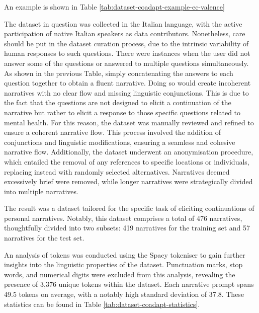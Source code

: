 
An example is shown in Table \ref{tab:dataset-coadapt-example-ec-valence}

The dataset in question was collected in the Italian language, with the active participation of native Italian speakers as data contributors. Nonetheless, care should be put in the dataset curation process, due to the intrinsic variability of human responses to such questions. There were instances when the user did not answer some of the questions or answered to multiple questions simultaneously. As shown in the previous Table, simply concatenating the answers to each question together to obtain a fluent narrative. Doing so would create incoherent narratives with no clear flow and missing linguistic conjunctions. This is due to the fact that the questions are not designed to elicit a continuation of the narrative but rather to elicit a response to those specific questions related to mental health.
For this reason, the dataset was manually reviewed and refined to ensure a coherent narrative flow. This process involved the addition of conjunctions and linguistic modifications, ensuring a seamless and cohesive narrative flow. Additionally, the dataset underwent an anonymisation procedure, which entailed the removal of any references to specific locations or individuals, replacing instead with randomly selected alternatives. Narratives deemed excessively brief were removed, while longer narratives were strategically divided into multiple narratives.
% 

The result was a dataset tailored for the specific task of eliciting continuations of personal narratives. Notably, this dataset comprises a total of 476 narratives, thoughtfully divided into two subsets: 419 narratives for the training set and 57 narratives for the test set.
% 

An analysis of tokens was conducted using the Spacy tokeniser to gain further insights into the linguistic properties of the dataset. Punctuation marks, stop words, and numerical digits were excluded from this analysis, revealing the presence of 3,376 unique tokens within the dataset. Each narrative prompt spans 49.5 tokens on average, with a notably high standard deviation of 37.8. These statistics can be found in Table \ref{tab:dataset-coadapt-statistics}. 

